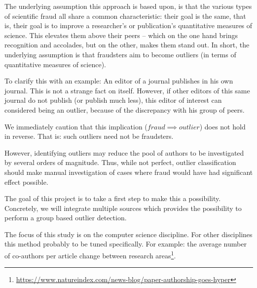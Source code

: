 \documentclass{ou-report}
\begin{document}
The underlying assumption this approach is based upon, is that the various types 
of scientific fraud all 
share a common characteristic: their goal is the same, that is, their goal 
is to improve a researcher's or publication's quantitative measures of 
science. This elevates them above their peers -- which on the one hand 
brings recognition and accolades, but on the other, makes them stand out. In 
short, the underlying assumption is that fraudsters aim to become outliers 
(in terms of quantitative measures of science).

To clarify this with an example: An editor of a journal publishes in his 
own journal. This is not a strange fact on itself. However, if other editors of
this same journal do not publish (or publish much less), this editor of interest
can considered being an outlier, because of the discrepancy with his group 
of peers. 

We immediately caution that this implication ($fraud \implies outlier$) does 
not hold in reverse. That is: such outliers need not be fraudsters. 

However, identifying outliers may reduce the pool of authors to be investigated
by se\-veral orders of magnitude. Thus, while not perfect, outlier classification
should make manual investigation of cases where fraud would have had significant
effect possible.

The goal of this project is to take a first step to make this a possibility.
Concretely, we will integrate multiple sources which provides the possibility
to perform a group based outlier detection.



The focus of this study is on the computer science 
discipline. For other disciplines this method probably to be tuned specifically. 
For example: the average number of co-authors per article change between research 
areas\footnote{\url{https://www.natureindex.com/news-blog/paper-authorship-goes-hyper}}.
\end{document}
